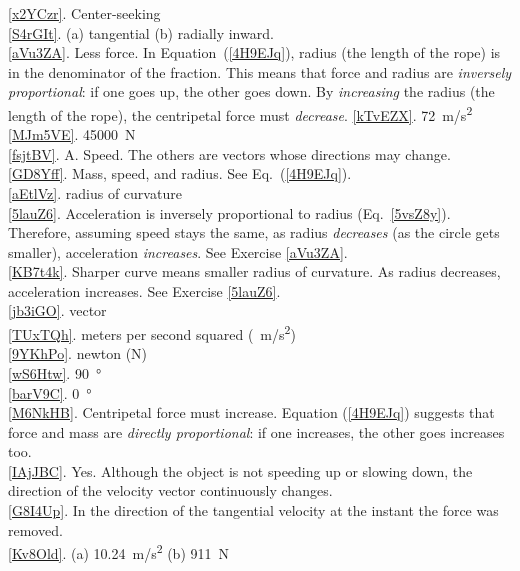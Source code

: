 \documentclass[main-physics.tex]{subfiles}
\begin{document}
\begin{multicols}{2}
\subsubsection*{}
\ref{x2YCzr}. Center-seeking\\
\ref{S4rGIt}. (a) tangential \hspace{1em} (b) radially inward.\\
\ref{aVu3ZA}. Less force. In Equation~(\ref{4H9EJq}), radius (the length of the rope) is in the denominator of the fraction. This means that force and radius are \textit{inversely proportional}: if one goes up, the other goes down. By \textit{increasing} the radius (the length of the rope), the centripetal force must \textit{decrease}.
\ref{kTvEZX}. \SI{72}{m/s^2}\\
\ref{MJm5VE}. \SI{45000}{N}\\
\ref{fsjtBV}. A. Speed. The others are vectors whose directions may change.\\
\ref{GD8Yff}. Mass, speed, and radius. See Eq.~(\ref{4H9EJq}).\\
\ref{aEtlVz}. radius of curvature\\
\ref{5lauZ6}. Acceleration is inversely proportional to radius (Eq.~\ref{5vsZ8y}). Therefore, assuming speed stays the same, as radius \textit{decreases} (as the circle gets smaller), acceleration \textit{increases}. See Exercise \ref{aVu3ZA}.\\
\ref{KB7t4k}. Sharper curve means smaller radius of curvature. As radius decreases, acceleration increases. See Exercise \ref{5lauZ6}.\\
\ref{jb3iGO}. vector\\
\ref{TUxTQh}. meters per second squared (\SI{}{m/s^2})\\
\ref{9YKhPo}. newton (N)\\
\ref{wS6Htw}. \SI{90}{\degree}\\
\ref{barV9C}. \SI{0}{\degree}\\
\ref{M6NkHB}. Centripetal force must increase. Equation (\ref{4H9EJq}) suggests that force and mass are \textit{directly proportional}: if one increases, the other goes increases too. \\
\ref{IAjJBC}. Yes. Although the object is not speeding up or slowing down, the direction of the velocity vector continuously changes. \\
\ref{G8I4Up}. In the direction of the tangential velocity at the instant the force was removed.\\
\ref{Kv8Old}. (a) \SI{10.24}{m/s^2} \hspace{1em} (b) \SI{911}{N}\\
\end{multicols}
\end{document}
